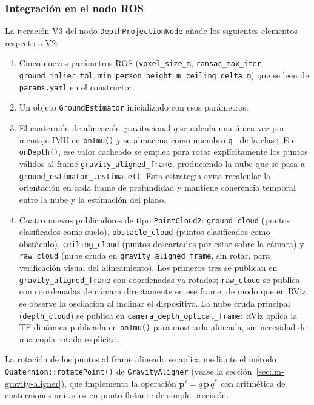 \subsubsection{Integración en el nodo ROS}

La iteración V3 del nodo \texttt{DepthProjectionNode} añade los siguientes
elementos respecto a V2:

\begin{enumerate}
  \item Cinco nuevos parámetros ROS (\texttt{voxel\_size\_m},
        \texttt{ransac\_max\_iter}, \texttt{ground\_inlier\_tol},
        \texttt{min\_person\_height\_m}, \texttt{ceiling\_delta\_m}) que
        se leen de \texttt{params.yaml} en el constructor.
  \item Un objeto \texttt{GroundEstimator} inicializado con esos parámetros.
  \item El cuaternión de alineación gravitacional $q$ se calcula una única vez
        por mensaje IMU en \texttt{onImu()} y se almacena como miembro
        \texttt{q\_} de la clase. En \texttt{onDepth()}, ese valor cacheado
        se emplea para rotar explícitamente los puntos válidos al frame
        \texttt{gravity\_aligned\_frame}, produciendo la nube que se pasa
        a \texttt{ground\_estimator\_.estimate()}. Esta estrategia evita
        recalcular la orientación en cada frame de profundidad y mantiene
        coherencia temporal entre la nube y la estimación del plano.
  \item Cuatro nuevos publicadores de tipo \texttt{PointCloud2}:
        \texttt{ground\_cloud} (puntos clasificados como suelo),
        \texttt{obstacle\_cloud} (puntos clasificados como obstáculo),
        \texttt{ceiling\_cloud} (puntos descartados por estar sobre la cámara)
        y \texttt{raw\_cloud} (nube cruda en \texttt{gravity\_aligned\_frame},
        sin rotar, para verificación visual del alineamiento).
        Los primeros tres se publican en \texttt{gravity\_aligned\_frame}
        con coordenadas ya rotadas; \texttt{raw\_cloud} se publica con
        coordenadas de cámara directamente en ese frame, de modo que en
        RViz se observe la oscilación al inclinar el dispositivo.
        La nube cruda principal (\texttt{depth\_cloud}) se publica en
        \texttt{camera\_depth\_optical\_frame}: RViz aplica la TF dinámica
        publicada en \texttt{onImu()} para mostrarla alineada, sin necesidad
        de una copia rotada explícita.
\end{enumerate}

La rotación de los puntos al frame alineado se aplica mediante el método
\texttt{Quaternion::rotatePoint()} de \texttt{GravityAligner}
(véase la sección~\ref{sec:lm-gravity-aligner}), que implementa la
operación $\mathbf{p}' = q\,\mathbf{p}\,q^{*}$ con aritmética de
cuaterniones unitarios en punto flotante de simple precisión.


